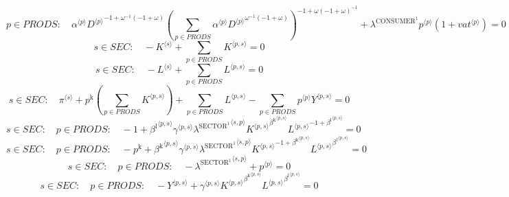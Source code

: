 \begin{equation}
p\in {P\!R\!O\!D\!S}\colon\quad {{\alpha}^{\langle p\rangle}} {{{D}^{\langle p\rangle}}^{-1 + {\omega}^{-1} \left(-1 + \omega\right)}} {\left(\sum_{p\in {P\!R\!O\!D\!S}} {{\alpha}^{\langle p\rangle}} {{{D}^{\langle p\rangle}}^{{\omega}^{-1} \left(-1 + \omega\right)}}\right)^{-1 + {\omega} \left(-1 + \omega\right)^{-1}}} + {\lambda^{\mathrm{CONSUMER}^{\mathrm{1}}}} {{p}^{\langle p\rangle}} \left(1 + {{v\!a\!t}}^{\langle p\rangle}\right) = 0
\end{equation}
\begin{equation}
s\in {S\!E\!C}\colon\quad -{K}^{\langle s\rangle} + \sum_{p\in {P\!R\!O\!D\!S}} {K}^{\langle p,s\rangle} = 0
\end{equation}
\begin{equation}
s\in {S\!E\!C}\colon\quad -{L}^{\langle s\rangle} + \sum_{p\in {P\!R\!O\!D\!S}} {L}^{\langle p,s\rangle} = 0
\end{equation}
\begin{equation}
s\in {S\!E\!C}\colon\quad {\pi}^{\langle s\rangle} + {p^{\mathrm{k}}} \left(\sum_{p\in {P\!R\!O\!D\!S}} {K}^{\langle p,s\rangle}\right) + \sum_{p\in {P\!R\!O\!D\!S}} {L}^{\langle p,s\rangle} - \sum_{p\in {P\!R\!O\!D\!S}} {{p}^{\langle p\rangle}} {{Y}^{\langle p,s\rangle}} = 0
\end{equation}
\begin{equation}
s\in {S\!E\!C}\colon\quad p\in {P\!R\!O\!D\!S}\colon\quad -1 + {{\beta^{\mathrm{l}}}^{\langle p,s\rangle}} {{\gamma}^{\langle p,s\rangle}} {{\lambda^{\mathrm{SECTOR}^{\mathrm{1}}}}^{\langle s,p\rangle}} {{{K}^{\langle p,s\rangle}}^{{\beta^{\mathrm{k}}}^{\langle p,s\rangle}}} {{{L}^{\langle p,s\rangle}}^{-1 + {\beta^{\mathrm{l}}}^{\langle p,s\rangle}}} = 0
\end{equation}
\begin{equation}
s\in {S\!E\!C}\colon\quad p\in {P\!R\!O\!D\!S}\colon\quad -p^{\mathrm{k}} + {{\beta^{\mathrm{k}}}^{\langle p,s\rangle}} {{\gamma}^{\langle p,s\rangle}} {{\lambda^{\mathrm{SECTOR}^{\mathrm{1}}}}^{\langle s,p\rangle}} {{{K}^{\langle p,s\rangle}}^{-1 + {\beta^{\mathrm{k}}}^{\langle p,s\rangle}}} {{{L}^{\langle p,s\rangle}}^{{\beta^{\mathrm{l}}}^{\langle p,s\rangle}}} = 0
\end{equation}
\begin{equation}
s\in {S\!E\!C}\colon\quad p\in {P\!R\!O\!D\!S}\colon\quad -{\lambda^{\mathrm{SECTOR}^{\mathrm{1}}}}^{\langle s,p\rangle} + {p}^{\langle p\rangle} = 0
\end{equation}
\begin{equation}
s\in {S\!E\!C}\colon\quad p\in {P\!R\!O\!D\!S}\colon\quad -{Y}^{\langle p,s\rangle} + {{\gamma}^{\langle p,s\rangle}} {{{K}^{\langle p,s\rangle}}^{{\beta^{\mathrm{k}}}^{\langle p,s\rangle}}} {{{L}^{\langle p,s\rangle}}^{{\beta^{\mathrm{l}}}^{\langle p,s\rangle}}} = 0
\end{equation}



